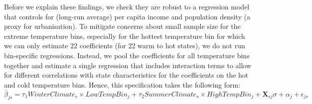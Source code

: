 \documentclass[11pt]{article}
\begin{document}
Before we explain these findings, we check they are robust to a regression model that controls for (long-run average) per capita income and population density (a proxy for urbanisation). To mitigate concerns about small sample size for the extreme temperature bins, especially for the hottest temperature bin for which we can only estimate 22 coefficients (for 22 warm to hot states), we do not run bin-specific regressions. Instead, we pool the coefficients for all temperature bins together and estimate a single regression that includes interaction terms to allow for different correlations with state characteristics for the coefficients on the hot and cold temperature bins. Hence, this specification takes the following form:  
\begin{equation}
\bar{\beta}_{js} = \tau_{1} WinterClimate_{s} \times LowTempBin_{j} + \tau_{2} SummerClimate_{s} \times HighTempBin_{j} + \textbf{X}_{sj} \sigma + \alpha_{j} + \epsilon_{js} \label{eq:heterorobust}%
\end{equation} 
\end{document}
